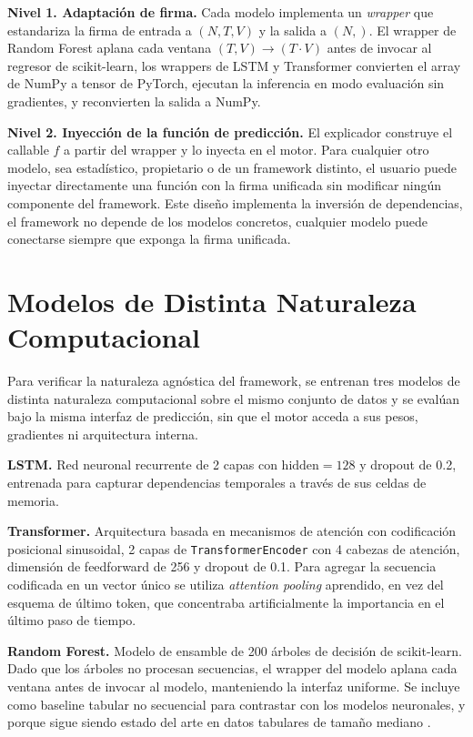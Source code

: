 \textbf{Nivel 1. Adaptación de firma.} Cada modelo implementa un \emph{wrapper} que estandariza la firma de entrada a $(N,T,V)$ y la salida a $(N,)$. El wrapper de Random Forest aplana cada ventana $(T,V) \rightarrow (T \cdot V)$ antes de invocar al regresor de scikit-learn, los wrappers de LSTM y Transformer convierten el array de NumPy a tensor de PyTorch, ejecutan la inferencia en modo evaluación sin gradientes, y reconvierten la salida a NumPy.

\textbf{Nivel 2. Inyección de la función de predicción.} El explicador construye el callable $f$ a partir del wrapper y lo inyecta en el motor. Para cualquier otro modelo, sea estadístico, propietario o de un framework distinto, el usuario puede inyectar directamente una función con la firma unificada sin modificar ningún componente del framework. Este diseño implementa la inversión de dependencias, el framework no depende de los modelos concretos, cualquier modelo puede conectarse siempre que exponga la firma unificada.

\section{Modelos de Distinta Naturaleza Computacional}

Para verificar la naturaleza agnóstica del framework, se entrenan tres modelos de distinta naturaleza computacional sobre el mismo conjunto de datos y se evalúan bajo la misma interfaz de predicción, sin que el motor acceda a sus pesos, gradientes ni arquitectura interna.

\textbf{LSTM.} Red neuronal recurrente de 2 capas con $\text{hidden}=128$ y dropout de 0.2, entrenada para capturar dependencias temporales a través de sus celdas de memoria.

\textbf{Transformer.} Arquitectura basada en mecanismos de atención con codificación posicional sinusoidal, 2 capas de \texttt{TransformerEncoder} con 4 cabezas de atención, dimensión de feedforward de 256 y dropout de 0.1. Para agregar la secuencia codificada en un vector único se utiliza \emph{attention pooling} aprendido, en vez del esquema de último token, que concentraba artificialmente la importancia en el último paso de tiempo.

\textbf{Random Forest.} Modelo de ensamble de 200 árboles de decisión de scikit-learn. Dado que los árboles no procesan secuencias, el wrapper del modelo aplana cada ventana antes de invocar al modelo, manteniendo la interfaz uniforme. Se incluye como baseline tabular no secuencial para contrastar con los modelos neuronales, y porque sigue siendo estado del arte en datos tabulares de tamaño mediano \cite{grinsztajn2022}.

